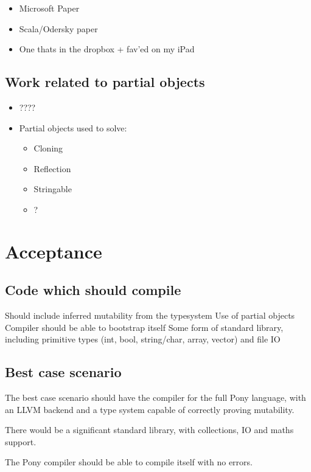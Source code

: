 \documentclass{article}
\begin{document}
\begin{itemize}
	\item Microsoft Paper
	\item Scala/Odersky paper
	\item One thats in the dropbox + fav'ed on my iPad
\end{itemize}

\subsection{Work related to partial objects}

\begin{itemize}
	\item ????
	\item Partial objects used to solve:
		\begin{itemize}
		\item Cloning
		\item Reflection
		\item Stringable
		\item ?
	\end{itemize}
	
\end{itemize}

\section{Acceptance}

\subsection{Code which should compile}

Should include inferred mutability from the typesystem
Use of partial objects
Compiler should be able to bootstrap itself
Some form of standard library, including primitive types (int, bool, string/char, array, vector) and file IO

\subsection{Best case scenario}

The best case scenario should have the compiler for the full Pony language, with an LLVM backend and a type system capable of correctly proving
mutability.

There would be a significant standard library, with collections, IO and maths support.

The Pony compiler should be able to compile itself with no errors.
\end{document}

